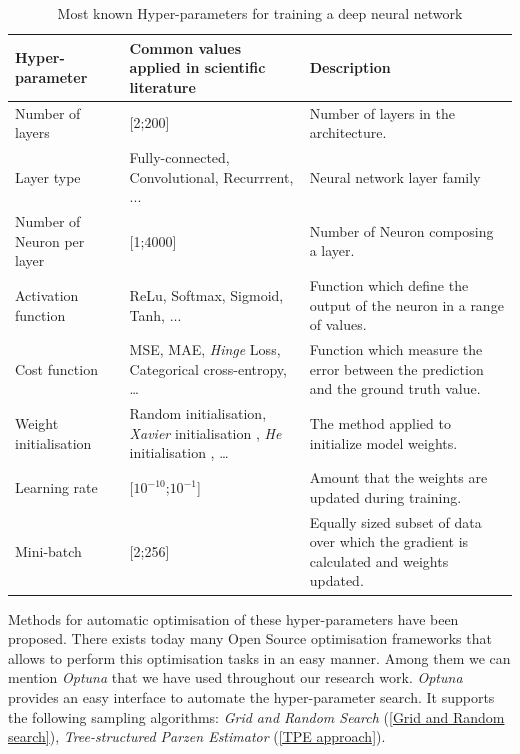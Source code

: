 \begin{table}[]
\label{tab:hyper-parameters}
\begin{tabular}{|l|p{4cm}|p{4cm}|}
\hline
\textbf{Hyper-parameter}           &  \textbf{Common values applied in scientific literature}  & \textbf{Description}                                    \\ \hline
Number of layers          & {[}2;200{]}                                     & Number of layers in the architecture.           \\ \hline
Layer type                & Fully-connected, Convolutional, Recurrrent, ... & Neural network layer family                                               \\ \hline
Number of Neuron per layer & {[}1;4000{]}                                    & Number of Neuron composing a layer.                                               \\ \hline
Activation function       & ReLu, Softmax, Sigmoid, Tanh, ...               & Function which define the output of the neuron in a range of values.                                                \\ \hline
Cost function             & MSE, MAE, \textit{Hinge} Loss, Categorical cross-entropy, \dots                                                & Function which measure the error between the prediction and the ground truth value.                                               \\ \hline
Weight initialisation     & Random initialisation, \textit{Xavier} initialisation \cite{glorot2010understanding}, \textit{He} initialisation \citep{he2015delving}, \dots                                                & The method applied to initialize model weights. \\ \hline
Learning rate             & {[}$10^{-10}$;$10^{-1}${]}                                                  &  Amount that the weights are updated during training.                                               \\ \hline
Mini-batch                & {[}2;256{]}                                     & Equally sized subset of data over which the gradient is calculated and weights updated.                                               \\ \hline
\end{tabular}
\caption{Most known Hyper-parameters for training a deep neural network}
\end{table}

Methods for automatic optimisation of these hyper-parameters have been proposed. There exists today many Open Source optimisation frameworks that allows to perform this optimisation tasks in an easy manner. Among them we can mention \textit{Optuna} \citep{optuna_2019} that we have used throughout our research work. \textit{Optuna} provides an easy interface to automate the hyper-parameter search. It supports the following sampling algorithms: \textit{Grid and Random Search} (\ref{Grid and Random search}), \textit{Tree-structured Parzen Estimator} (\ref{TPE approach}).


